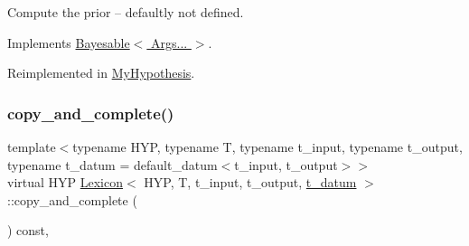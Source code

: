 Compute the prior -- defaultly not defined. 



Implements \hyperlink{class_bayesable_a9aa752f0adff1b95f8957b91fc928649}{Bayesable$<$ Args... $>$}.



Reimplemented in \hyperlink{class_my_hypothesis_a67752bb4ba61994ef0cb64f7f9031f7f}{My\+Hypothesis}.

\mbox{\label{class_lexicon_a52a6e819264e04584320adca868aec4a}} 
\subsubsection{\texorpdfstring{copy\+\_\+and\+\_\+complete()}{copy\_and\_complete()}}
{\footnotesize\ttfamily template$<$typename H\+YP, typename T, typename t\+\_\+input, typename t\+\_\+output, typename t\+\_\+datum = default\+\_\+datum$<$t\+\_\+input, t\+\_\+output$>$$>$ \\
virtual H\+YP \hyperlink{class_lexicon}{Lexicon}$<$ H\+YP, T, t\+\_\+input, t\+\_\+output, \hyperlink{class_bayesable_a7c93a2eeab708378eb321745908718d4}{t\+\_\+datum} $>$\+::copy\+\_\+and\+\_\+complete (\begin{DoxyParamCaption}{ }\end{DoxyParamCaption}) const\hspace{0.3cm}{\ttfamily [inline]}, {\ttfamily [virtual]}}

\mbox{\label{class_lexicon_a1c6b61ac505114f23441e3097163685b}} 
